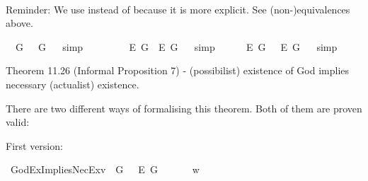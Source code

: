 \begin{isabellebody}
\ %
%
%
%
%
\begin{isamarkuptext}%
Reminder: We use  instead of  because it is more explicit. See (non-)equivalences above.%
\end{isamarkuptext}\isamarkuptrue%
\isamarkupfalse%
\ {\isachardoublequoteopen}{\isasymlfloor}\isactrlbold {\isasymexists}\ G\ \isactrlbold {\isasymleftrightarrow}\ \isactrlbold {\isasymexists}\ \isactrlbold {\isasymdown}G{\isasymrfloor}{\isachardoublequoteclose}%
\ %
%
\isamarkupfalse%
\ simp%
%
%
\ \ \ \ \ \ \ \isanewline
{}\isamarkupfalse%
\ {\isachardoublequoteopen}{\isasymlfloor}\isactrlbold {\isasymexists}\isactrlsup E\ G\ \isactrlbold {\isasymleftrightarrow}\ \isactrlbold {\isasymexists}\isactrlsup E\ \isactrlbold {\isasymdown}G{\isasymrfloor}{\isachardoublequoteclose}%
\ %
%
\isamarkupfalse%
\ simp%
%
%
\ \ \ \ \isanewline
{}\isamarkupfalse%
\ {\isachardoublequoteopen}{\isasymlfloor}\isactrlbold {\isasymbox}\isactrlbold {\isasymexists}\isactrlsup E\ G\ \isactrlbold {\isasymleftrightarrow}\ \ \isactrlbold {\isasymbox}\isactrlbold {\isasymexists}\isactrlsup E\ \isactrlbold {\isasymdown}G{\isasymrfloor}{\isachardoublequoteclose}%
\ %
%
\isamarkupfalse%
\ simp%
%
%
%
\begin{isamarkuptext}%
Theorem 11.26 (Informal Proposition 7) - (possibilist) existence of God implies necessary (actualist) existence.%
\end{isamarkuptext}\isamarkuptrue%
%
\begin{isamarkuptext}%
There are two different ways of formalising this theorem. Both of them are proven valid:%
\end{isamarkuptext}\isamarkuptrue%
%
\begin{isamarkuptext}%
First version:%
\end{isamarkuptext}\isamarkuptrue%
\isamarkupfalse%
\ GodExImpliesNecEx{\isacharunderscore}v{}{\isacharcolon}\ {\isachardoublequoteopen}{\isasymlfloor}\isactrlbold {\isasymexists}\ \isactrlbold {\isasymdown}G\ \isactrlbold {\isasymrightarrow}\ \ \isactrlbold {\isasymbox}\isactrlbold {\isasymexists}\isactrlsup E\ \isactrlbold {\isasymdown}G{\isasymrfloor}{\isachardoublequoteclose}\ \isanewline
%
%
%
\isamarkupfalse%
\ {\isacharminus}\isanewline
\isacommand{{\isacharbraceleft}}\isamarkupfalse%
\isanewline
\ \ \isamarkupfalse%
\ w\ \isanewline
\ \ \isacommand{{\isacharbraceleft}}\isamarkupfalse%

\end{isabellebody}
